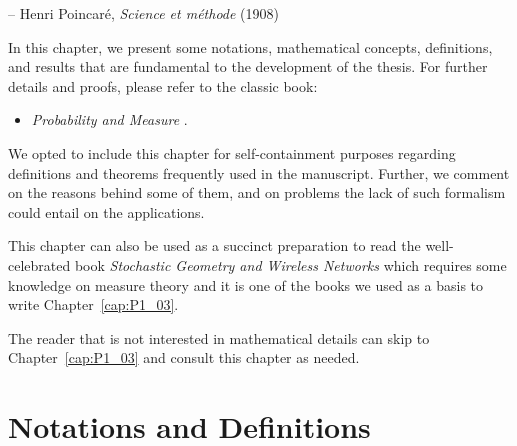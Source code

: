 %
{-- Henri Poincar\'e, \textit{Science et méthode} (1908)}


In this chapter, we present some notations, mathematical concepts, definitions, and results that are fundamental to the development of the thesis.
%
For further details and proofs, please refer to the classic book:
%
\begin{itemize}
    \item \textit{Probability and Measure} \cite{billingsley1986probability}.
\end{itemize}

We opted to include this chapter for self-containment purposes regarding definitions and theorems frequently used in the manuscript.
%
Further, we comment on the reasons behind some of them, and on problems the lack of such formalism could entail on the applications.

This chapter can also be used as a succinct preparation to read the well-celebrated book \textit{Stochastic Geometry and Wireless Networks} \cite{baccelli2010stochastic} which requires some knowledge on measure theory and it is one of the books we used as a basis to write Chapter~\ref{cap:P1_03}.

\begin{note}
    The reader that is not interested in mathematical details can skip to Chapter~\ref{cap:P1_03} and consult this chapter as needed.
\end{note}

\newpage

\section{Notations and Definitions}


